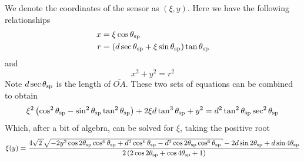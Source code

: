 We denote the coordinates of the sensor as $(\xi,y)$.  Here we have the
following relationships
\begin{align}
x &= \xi \cos \theta_\mathrm{sp} \label{eqn:conic01a} \\
r &= \left(d \sec \theta_\mathrm{sp} + \xi \sin \theta_\mathrm{sp}\right) \tan\theta_\mathrm{sp} \label{eqn:conic01b}
\end{align}
and
\begin{equation}
x^2+y^2=r^2
\label{eqn:conic01c}
\end{equation}
Note $d \sec\theta_\mathrm{sp}$ is the length of $\overline{OA}$.  These two sets of
equations can be combined to obtain
\begin{equation}
\xi^2 \left(\cos ^2\theta_\mathrm{sp}-\sin ^2\theta_\mathrm{sp} \tan
^2\theta_\mathrm{sp}\right)+2 \xi d \tan ^3\theta_\mathrm{sp}+y^2=d^2 \tan
^2\theta_\mathrm{sp} \sec ^2\theta_\mathrm{sp}
\end{equation}
Which, after a bit of algebra, can be solved for $\xi$, taking
the positive root
\begin{equation}
\xi(y) = \frac{4 \sqrt{2} \sqrt{-2 y^2 \cos 2 \thetasp  \cos ^6\thetasp +d^2
\cos ^6\thetasp -d^2 \cos 2 \thetasp  \cos^6\thetasp}-2 d \sin 2 \thetasp
+d \sin 4 \thetasp }{2 \left(2 \cos 2 \thetasp +\cos 4 \thetasp +1\right)}
\label{eqn:conic02}
\end{equation}


